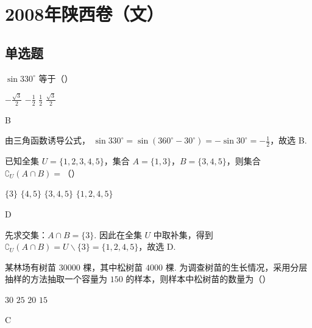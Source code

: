 \chapter{2008年陕西卷（文）}

\section{单选题}

\begin{problem}
\(\sin 330^{\circ}\) 等于（\quad）

\choices
    {\(-\frac{\sqrt{3}}{2}\)}
    {\(-\frac{1}{2}\)}
    {\( \frac{1}{2} \)}
    {\(\frac{\sqrt{3}}{2}\)}
\end{problem}

\begin{answer}
B
\end{answer}

\begin{solution}
由三角函数诱导公式，
\(\sin 330^{\circ}=\sin\left(360^{\circ}-30^{\circ}\right)=-\sin30^{\circ}=-\frac{1}{2}\)，故选 B.
\end{solution}

\begin{problem}
已知全集 \(U = \{1, 2, 3, 4, 5\}\)，集合 \(A = \{1, 3\}\)，\(B = \{3, 4, 5\}\)，则集合 \(\complement_U(A \cap B) =\)（\quad）

\choices
    {\(\{3\}\)}
    {\(\{4, 5\}\)}
    {\(\{3, 4, 5\}\)}
    {\(\{1, 2, 4, 5\}\)}
\end{problem}

\begin{answer}
D
\end{answer}

\begin{solution}
先求交集：\(A\cap B=\{3\}\). 因此在全集 \(U\) 中取补集，得到
\(\complement_U(A\cap B)=U\mathbin{\backslash}\{3\}=\{1,2,4,5\}\)，故选 D.
\end{solution}

\begin{problem}
某林场有树苗 \(30000\) 棵，其中松树苗 \(4000\) 棵. 为调查树苗的生长情况，采用分层抽样的方法抽取一个容量为 \(150\) 的样本，则样本中松树苗的数量为（\quad）

\choices
    {\(30\)}
    {\(25\)}
    {\(20\)}
    {\(15\)}
\end{problem}

\begin{answer}
C
\end{answer}

